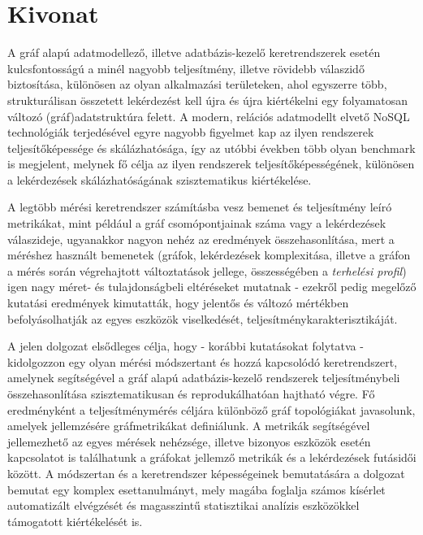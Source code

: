\setcounter{page}{1}


\englishParagraph
\chapter*{Kivonat}

A gráf alapú adatmodellező, illetve adatbázis-kezelő keretrendszerek esetén kulcsfontosságú a minél nagyobb teljesítmény, illetve rövidebb válaszidő biztosítása, különösen az olyan alkalmazási területeken, ahol egyszerre több, strukturálisan összetett lekérdezést kell újra és újra kiértékelni egy folyamatosan változó (gráf)adatstruktúra felett. A modern, relációs adatmodellt elvető NoSQL technológiák terjedésével egyre nagyobb figyelmet kap az ilyen rendszerek teljesítőképessége és skálázhatósága, így az utóbbi években több olyan benchmark is megjelent, melynek fő célja az ilyen rendszerek teljesítőképességének, különösen a lekérdezések skálázhatóságának szisztematikus kiértékelése. 

A legtöbb mérési keretrendszer számításba vesz bemenet és teljesítmény leíró metrikákat, mint például a gráf csomópontjainak száma vagy a lekérdezések válaszideje, ugyanakkor nagyon nehéz az eredmények összehasonlítása, mert a méréshez használt bemenetek (gráfok, lekérdezések komplexitása, illetve a gráfon a mérés során végrehajtott változtatások jellege, összességében a \emph{terhelési profil}) igen nagy méret- és tulajdonságbeli eltéréseket mutatnak - ezekről pedig megelőző kutatási eredmények kimutatták, hogy jelentős és változó mértékben befolyásolhatják az egyes eszközök viselkedését, teljesítménykarakterisztikáját.

A jelen dolgozat elsődleges célja, hogy - korábbi kutatásokat \cite{metric_ase} folytatva - kidolgozzon egy olyan mérési módszertant és hozzá kapcsolódó keretrendszert, amelynek segítségével a gráf alapú adatbázis-kezelő rendszerek teljesítménybeli összehasonlítása szisztematikusan és reprodukálhatóan hajtható végre. Fő eredményként a teljesítménymérés céljára különböző gráf topológiákat javasolunk, amelyek jellemzésére gráfmetrikákat definiálunk. A metrikák segítségével jellemezhető az egyes mérések nehézsége, illetve bizonyos eszközök esetén kapcsolatot is találhatunk a gráfokat jellemző metrikák és a lekérdezések futásidői között. A módszertan és a keretrendszer képességeinek bemutatására a dolgozat bemutat egy komplex esettanulmányt, mely magába foglalja számos kísérlet automatizált elvégzését és magasszintű statisztikai analízis eszközökkel támogatott kiértékelését is.

